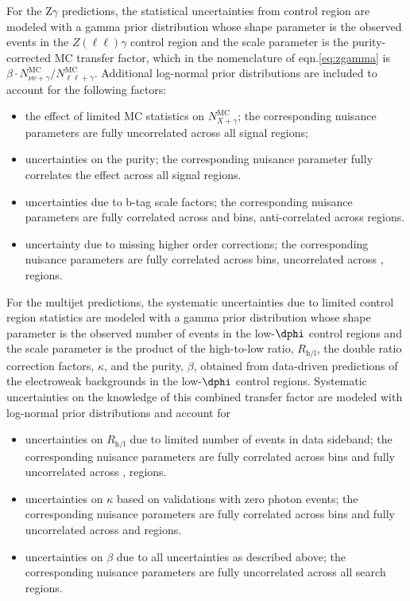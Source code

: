 For the Z$\gamma$ predictions, the statistical uncertainties from control 
region are modeled with a gamma
prior distribution whose shape parameter is the observed events in the 
$Z(\ell\ell)\gamma$ control region and the scale parameter is the 
purity-corrected MC transfer factor, which in the nomenclature of 
eqn.\ref{eq:zgamma} is 
$\beta\cdot N_{\nu\nu+\gamma}^{\mathrm{MC}}/N_{\ell\ell+\gamma}^{\mathrm{MC}}$.
Additional log-normal prior distributions are included to account 
for the following factors:
\begin{itemize}
 \item the effect of limited MC statistics on $N_{X+\gamma}^{\mathrm{MC}}$; the corresponding nuisance parameters are fully uncorrelated across all signal regions;
 \item uncertainties on the purity; the corresponding nuisance parameter fully correlates the effect across all signal regions.
 \item uncertainties due to b-tag scale factors; the corresponding nuisance parameters are fully correlated across \ptmiss and \nj bins, anti-correlated across \nb regions.
 \item uncertainty due to missing higher order corrections; the corresponding nuisance parameters are fully correlated across \ptmiss bins, uncorrelated across \nb, \nj regions.
\end{itemize}


For the multijet predictions, the systematic uncertainties due to limited 
control region statistics are modeled with a 
gamma prior distribution whose shape parameter is the observed number
of events in the low-$\dphi$ control regions and the scale parameter
is the product of the high-to-low ratio, $R_{\mathrm{h/l}}$, the double ratio
correction factors, $\kappa$, and the purity, $\beta$, obtained from data-driven predictions
of the electroweak backgrounds in the low-$\dphi$ control regions. 
Systematic uncertainties on the knowledge of this combined transfer factor are 
modeled with log-normal prior distributions and account for

\begin{itemize}
 \item uncertainties on $R_{\mathrm{h/l}}$ due to limited number of events in data sideband; the corresponding nuisance parameters 
 are fully correlated across \ptmiss bins and fully uncorrelated across \nb, \nj regions.
 \item uncertainties on $\kappa$ based on validations with zero photon events; the corresponding nuisance parameters are fully 
   correlated across \ptmiss bins and fully uncorrelated across \nb and \nj regions.
 \item uncertainties on $\beta$ due to all uncertainties as described above; the corresponding nuisance parameters are 
  fully uncorrelated across all search regions.
\end{itemize} 

